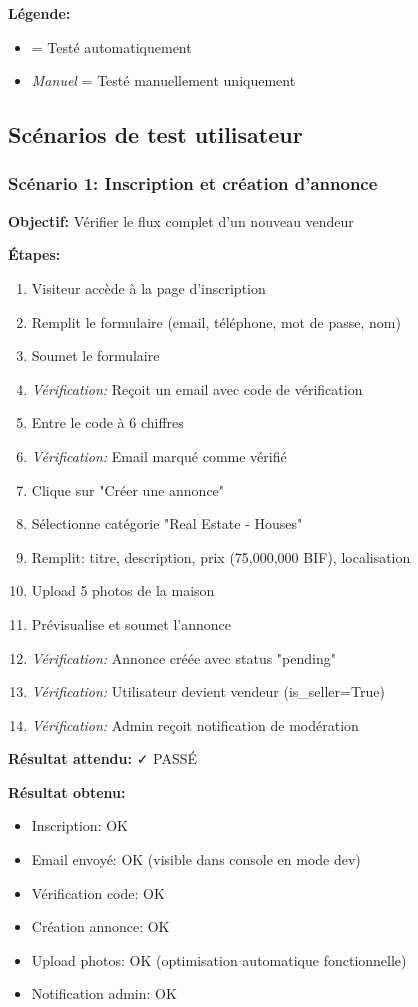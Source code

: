 \textbf{Légende:}
\begin{itemize}
    \item \checkmark = Testé automatiquement
    \item \textit{Manuel} = Testé manuellement uniquement
\end{itemize}

\subsection{Scénarios de test utilisateur}

\subsubsection{Scénario 1: Inscription et création d'annonce}

\textbf{Objectif:} Vérifier le flux complet d'un nouveau vendeur

\textbf{Étapes:}
\begin{enumerate}
    \item Visiteur accède à la page d'inscription
    \item Remplit le formulaire (email, téléphone, mot de passe, nom)
    \item Soumet le formulaire
    \item \textit{Vérification:} Reçoit un email avec code de vérification
    \item Entre le code à 6 chiffres
    \item \textit{Vérification:} Email marqué comme vérifié
    \item Clique sur "Créer une annonce"
    \item Sélectionne catégorie "Real Estate - Houses"
    \item Remplit: titre, description, prix (75,000,000 BIF), localisation
    \item Upload 5 photos de la maison
    \item Prévisualise et soumet l'annonce
    \item \textit{Vérification:} Annonce créée avec status "pending"
    \item \textit{Vérification:} Utilisateur devient vendeur (is\_seller=True)
    \item \textit{Vérification:} Admin reçoit notification de modération
\end{enumerate}

\textbf{Résultat attendu:} ✓ PASSÉ

\textbf{Résultat obtenu:}
\begin{itemize}
    \item Inscription: OK
    \item Email envoyé: OK (visible dans console en mode dev)
    \item Vérification code: OK
    \item Création annonce: OK
    \item Upload photos: OK (optimisation automatique fonctionnelle)
    \item Notification admin: OK
\end{itemize}

